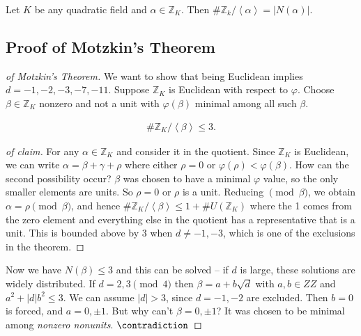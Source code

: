 \begin{lemma}[?]

Let \(K\) be any quadratic field and \(\alpha\in {\mathbb{Z}}_K\). Then
\(\# {\mathbb{Z}}_k / \left\langle{ \alpha }\right\rangle = {\left\lvert {N( \alpha )} \right\rvert}\).

\end{lemma}

\hypertarget{proof-of-motzkins-theorem}{%
\subsection{Proof of Motzkin's
Theorem}\label{proof-of-motzkins-theorem}}

\begin{proof}[of Motzkin's Theorem]

We want to show that being Euclidean implies \(d=-1,-2,-3,-7,-11\).
Suppose \({\mathbb{Z}}_K\) is Euclidean with respect to \(\varphi\).
Choose \(\beta\in {\mathbb{Z}}_K\) nonzero and not a unit with
\(\varphi(\beta)\) minimal among all such \(\beta\).

\begin{claim}

\begin{align*}
\# {\mathbb{Z}}_K / \left\langle{ \beta }\right\rangle \leq 3 
.\end{align*}

\end{claim}

\begin{proof}[of claim]

For any \(\alpha\in {\mathbb{Z}}_K\) and consider it in the quotient.
Since \({\mathbb{Z}}_K\) is Euclidean, we can write
\(\alpha = \beta + \gamma+ \rho\) where either \(\rho=0\) or
\(\varphi(\rho ) < \varphi (\beta )\). How can the second possibility
occur? \(\beta\) was chosen to have a minimal \(\varphi\) value, so the
only smaller elements are units. So \(\rho = 0\) or \(\rho\) is a unit.
Reducing \(\pmod\beta\), we obtain \(\alpha= \rho \pmod\beta\), and
hence
\(\# {\mathbb{Z}}_K / \left\langle{ \beta }\right\rangle \leq 1 + \# U({\mathbb{Z}}_K)\)
where the 1 comes from the zero element and everything else in the
quotient has a representative that is a unit. This is bounded above by
\(3\) when \(d\neq -1, -3\), which is one of the exclusions in the
theorem.

\end{proof}

Now we have \(N( \beta) \leq 3\) and this can be solved -- if \(d\) is
large, these solutions are widely distributed. If \(d = 2, 3 \pmod 4\)
then \(\beta= a + b \sqrt{d}\) with \(a, b \in ZZ\) and
\(a^2 + {\left\lvert {d} \right\rvert}b^2 \leq 3\). We can assume
\({\left\lvert {d} \right\rvert}> 3\), since \(d=-1, -2\) are excluded.
Then \(b=0\) is forced, and \(a = 0, \pm 1\). But why can't
\(\beta=0, \pm 1\)? It was chosen to be minimal among \emph{nonzero
nonunits}. \(\contradiction\)


\end{proof}
